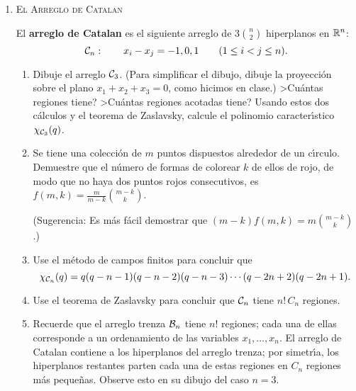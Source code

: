 \documentclass[letterpaper,10pt]{article}
\begin{document}
\begin{enumerate}
\begin{enumerate}
\item Use el m{\'e}todo de campos finitos para calcular el
polinomio caracter{\'\i}stico del arreglo
$$
{\cal H}_n: \qquad x_i = 0 \qquad (1 \leq i \leq n).
$$

\item Use el m{\'e}todo de campos finitos para calcular el
polinomio caracter{\'\i}stico del {\bf arreglo trenza}
$$
{\cal B}_n: \qquad x_i = x_j \qquad (1 \leq i < j \leq n).
$$

\end{enumerate}




\newpage

\item \textsc{El Arreglo de Catalan}

El {\bf arreglo de Catalan} es el siguiente arreglo de $3{n
\choose 2}$ hiperplanos en $\Bbb R^n$:
$$
{\cal C}_n: \qquad x_i - x_j = -1, 0, 1 \qquad (1 \leq i < j \leq
n).
$$
\begin{enumerate}
\item Dibuje el arreglo ${\cal C}_3$. (Para simplificar el dibujo,
dibuje la proyecci{\'o}n sobre el plano $x_1+x_2+x_3 = 0$, como
hicimos en clase.)
>Cu{\'a}ntas regiones tiene? >Cu{\'a}ntas regiones acotadas tiene?
Usando estos dos c\'{a}lculos y el teorema de Zaslavsky, calcule
el polinomio caracter{\'\i}stico $\chi_{{\cal C}_3}(q)$.

\item Se tiene una colecci{\'o}n de $m$ puntos dispuestos
alrededor de un c{\'\i}rculo. Demuestre que el n{\'u}mero de
formas de colorear $k$ de ellos de rojo, de modo que no haya dos
puntos rojos consecutivos, es $f(m,k) = \frac{m}{m-k} {m-k \choose
k}$.

(Sugerencia: Es m{\'a}s f{\'a}cil demostrar que $(m-k)f(m,k) = m
{m-k \choose k}$.)

 \item Use el m\'{e}todo de campos finitos para concluir que
$$
\chi_{{\cal C}_n}(q) =
q(q-n-1)(q-n-2)(q-n-3)\cdots(q-2n+2)(q-2n+1).
$$

\item Use el teorema de Zaslavsky para concluir que ${\cal C}_n$
tiene $n! \, C_n$ regiones.


\item Recuerde que el arreglo trenza ${\cal B}_n$ tiene $n!$
regiones; cada una de ellas corresponde a un ordenamiento de las
variables $x_1, \ldots, x_n$. El arreglo de Catalan contiene a los
hiperplanos del arreglo trenza; por simetr{\'\i}a, los hiperplanos
restantes parten cada una de estas regiones en $C_n$ regiones
m{\'a}s peque{\~n}as. Observe esto en su dibujo del caso $n=3$.


\end{enumerate}
\end{enumerate}
\end{document}
